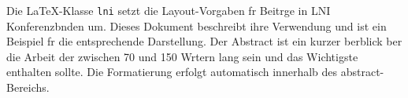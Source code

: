 Die \LaTeX-Klasse \texttt{lni} setzt die Layout-Vorgaben fr Beitrge in LNI Konferenzbnden um. Dieses Dokument beschreibt ihre Verwendung und ist ein Beispiel fr die entsprechende Darstellung. Der Abstract ist ein kurzer berblick ber die Arbeit der zwischen 70 und 150 Wrtern lang sein und das Wichtigste enthalten sollte. Die Formatierung erfolgt automatisch innerhalb des abstract-Bereichs.